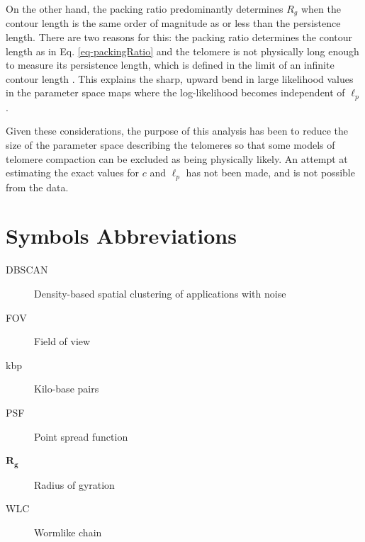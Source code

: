 \documentclass[12pt, a4paper]{article}
\begin{document}
On the other hand, the packing ratio predominantly determines $R_g$
when the contour length is the same order of magnitude as or less
than the persistence length. There are two reasons for this: the
packing ratio determines the contour length as in
Eq. \eqref{eq-packingRatio} and the telomere is not physically long
enough to measure its persistence length, which is defined in the
limit of an infinite contour length
\cite{schellman-biopolymers-1974}. This explains the sharp, upward
bend in large likelihood values in the parameter space maps where
the log-likelihood becomes independent of $\ell_p$.

Given these considerations, the purpose of this analysis has been
to reduce the size of the parameter space describing the telomeres
so that some models of telomere compaction can be excluded as being
physically likely. An attempt at estimating the exact values for
$c$ and $\ell_p$ has not been made, and is not possible from the
data.

\section{Symbols Abbreviations}
\label{sec-4}
\begin{description}
\item[{DBSCAN}] Density-based spatial clustering of applications with
noise
\item[{FOV}] Field of view
\item[{kbp}] Kilo-base pairs
\item[{PSF}] Point spread function
\item[{$\mathbf{R_g}$}] Radius of gyration
\item[{WLC}] Wormlike chain
\end{description}

\printbibliography
\end{document}
